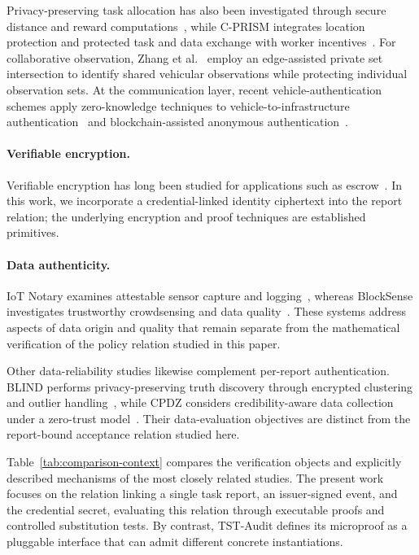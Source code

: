 \documentclass[pdflatex,iicol,sn-mathphys-num]{sn-jnl}
\begin{document}
Privacy-preserving task allocation has also been investigated through secure distance and reward computations~\citep{Li2025LocationReward}, while C-PRISM integrates location protection and protected task and data exchange with worker incentives~\citep{Bai2026CPRISM}. For collaborative observation, Zhang et al.~\citep{Zhang2026EAPSI} employ an edge-assisted private set intersection to identify shared vehicular observations while protecting individual observation sets. At the communication layer, recent vehicle-authentication schemes apply zero-knowledge techniques to vehicle-to-infrastructure authentication~\citep{Naskar2025V2I} and blockchain-assisted anonymous authentication~\citep{Wang2025ZKAuth}.

\paragraph{Verifiable encryption.} Verifiable encryption has long been studied for applications such as escrow~\citep{CamenischShoup2003}. In this work, we incorporate a credential-linked identity ciphertext into the report relation; the underlying encryption and proof techniques are established primitives.

\paragraph{Data authenticity.} IoT Notary examines attestable sensor capture and logging~\citep{Panwar2022IoTNotary}, whereas BlockSense investigates trustworthy crowdsensing and data quality~\citep{Huang2024BlockSense}. These systems address aspects of data origin and quality that remain separate from the mathematical verification of the policy relation studied in this paper.

Other data-reliability studies likewise complement per-report authentication. BLIND performs privacy-preserving truth discovery through encrypted clustering and outlier handling~\citep{Agate2024BLIND}, while CPDZ considers credibility-aware data collection under a zero-trust model~\citep{Tang2025CPDZ}. Their data-evaluation objectives are distinct from the report-bound acceptance relation studied here.

Table~\ref{tab:comparison-context} compares the verification objects and explicitly described mechanisms of the most closely related studies. The present work focuses on the relation linking a single task report, an issuer-signed event, and the credential secret, evaluating this relation through executable proofs and controlled substitution tests. By contrast, TST-Audit defines its microproof as a pluggable interface that can admit different concrete instantiations.
\end{document}

